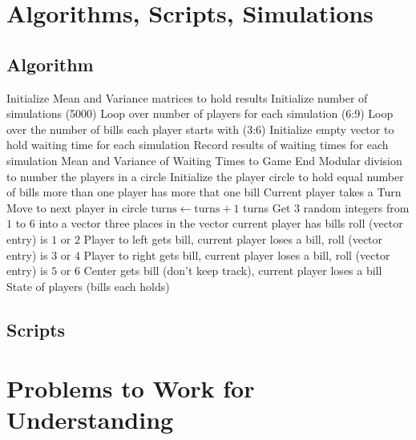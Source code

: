 \documentclass[12pt]{article}
\begin{document}
\hr

\section*{Algorithms, Scripts, Simulations}

\subsection*{Algorithm}

\begin{codebox}
  \li Initialize Mean and Variance matrices to hold results
  \li Initialize number of simulations (5000)
  \li Loop over number of players for each simulation (6:9)
  \Li Loop over the number of bills each player starts with (3:6)
  \li Initialize empty vector to hold waiting time for each simulation
  \li Record results of waiting times for each simulation
  \li \Return Mean and Variance of Waiting Times to Game End
  \li Modular division to number the players in a circle
  \li Initialize the player circle to hold equal number of bills
  \li \While more than one player has more that one bill
  \li Current player takes a Turn
  \li Move to next player in circle
  \li $\text{turns} \gets \text{turns} + 1$
  \li \End
  \li \Return turns
  \li Get $3$ random integers from $1$ to $6$ into a vector
  \li \For three places in the vector
  \li \If current player has bills
  \li \If roll (vector entry) is $1$ or $2$
  \li Player to left gets bill, current player loses a bill, 
  \li \If roll (vector entry) is $3$ or $4$
  \li Player to right gets bill, current player loses a bill, 
  \li \If roll (vector entry) is $5$ or $6$
  \li Center gets bill (don't keep track), current player loses a bill
  \Return State of players (bills each holds)
\end{codebox}

\subsection*{Scripts}



\hr

\section*{Problems to Work for Understanding}
\end{document}
